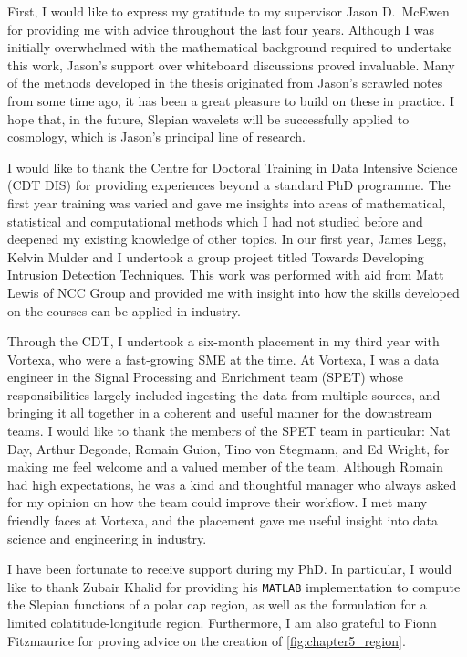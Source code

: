 \begin{acknowledgements}
	First, I would like to express my gratitude to my supervisor Jason D.~McEwen for providing me with advice throughout the last four years.
	Although I was initially overwhelmed with the mathematical background required to undertake this work, Jason's support over whiteboard discussions proved invaluable.
	Many of the methods developed in the thesis originated from Jason's scrawled notes from some time ago, it has been a great pleasure to build on these in practice.
	I hope that, in the future, Slepian wavelets will be successfully applied to cosmology, which is Jason's principal line of research.

	I would like to thank the Centre for Doctoral Training in Data Intensive Science (CDT DIS) for providing experiences beyond a standard PhD programme.
	The first year training was varied and gave me insights into areas of mathematical, statistical and computational methods which I had not studied before and deepened my existing knowledge of other topics.
	In our first year, James Legg, Kelvin Mulder and I undertook a group project titled Towards Developing Intrusion Detection Techniques.
	This work was performed with aid from Matt Lewis of NCC Group and provided me with insight into how the skills developed on the courses can be applied in industry.

	Through the CDT, I undertook a six-month placement in my third year with Vortexa, who were a fast-growing SME at the time.
	At Vortexa, I was a data engineer in the Signal Processing and Enrichment team (SPET) whose responsibilities largely included ingesting the data from multiple sources, and bringing it all together in a coherent and useful manner for the downstream teams.
	I would like to thank the members of the SPET team in particular: Nat Day, Arthur Degonde, Romain Guion, Tino von Stegmann, and Ed Wright, for making me feel welcome and a valued member of the team.
	Although Romain had high expectations, he was a kind and thoughtful manager who always asked for my opinion on how the team could improve their workflow.
	I met many friendly faces at Vortexa, and the placement gave me useful insight into data science and engineering in industry.

	I have been fortunate to receive support during my PhD.
	In particular, I would like to thank Zubair Khalid for providing his \texttt{MATLAB} implementation to compute the Slepian functions of a polar cap region, as well as the formulation for a limited colatitude-longitude region.
	Furthermore, I am also grateful to Fionn Fitzmaurice for proving advice on the creation of \cref{fig:chapter5_region}.


\end{acknowledgements}
